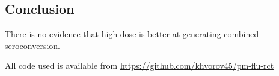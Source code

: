 \documentclass[11pt]{article}
\begin{document}






\subsection{Conclusion}

There is no evidence that high dose is better at generating combined
seroconversion.



All code used is available from \url{https://github.com/khvorov45/pm-flu-rct}
\end{document}
